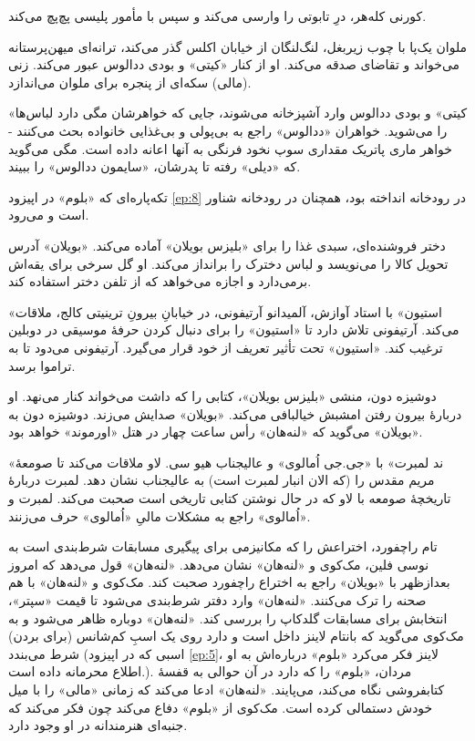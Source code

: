 \documentclass[12pt]{book}
\newcommand{\noun}[1]{«{#1}»}
\begin{document}
    کورنی کله‌هر، درِ تابوتی را وارسی می‌کند و سپس با مأمور پلیسی پچ‌پچ می‌کند.

    ملوان یک‌پا با چوب زیربغل، لنگ‌لنگان از خیابان اکلس گذر می‌کند، ترانه‌ای میهن‌پرستانه می‌خواند و تقاضای صدقه می‌کند. او از کنار \noun{کیتی} و بودی ددالوس عبور می‌کند. زنی (مالی) سکه‌ای از پنجره برای ملوان می‌اندازد.

    \noun{کیتی} و بودی ددالوس وارد آشپزخانه می‌شوند، جایی که خواهرشان مگی دارد لباس‌ها را می‌شوید. خواهران \noun{ددالوس} راجع به بی‌پولی و بی‌غذایی خانواده بحث می‌کنند - خواهر ماری پاتریک مقداری سوپ نخود فرنگی به آنها اعانه داده است. مگی می‌گوید که \noun{دیلی} رفته تا پدرشان، \noun{سایمون ددالوس‬} را ببیند.

    تکه‌پاره‌ای که \noun{بلوم} در اپیزود \ref{ep:8} در رودخانه انداخته بود، همچنان در رودخانه شناور است و می‌رود.

    دختر فروشنده‌ای، سبدی غذا را برای \noun{بلیزس بویلان‬} آماده می‌کند. \noun{بویلان} آدرس تحویل کالا را می‌نویسد و لباس دخترک را برانداز می‌کند. او گل سرخی برای یقه‌اش برمی‌دارد و اجازه می‌خواهد که از تلفن دختر استفاده کند.

    \noun{استیون} با استاد آوازش، آلمیدانو آرتیفونی، در خیابانِ بیرونِ ترینیتی کالج، ملاقات می‌کند. آرتیفونی تلاش دارد تا \noun{استیون} را برای دنبال کردن حرفۀ موسیقی در دوبلین ترغیب کند. \noun{استیون} تحت تأثیر تعریف از خود قرار می‌گیرد. آرتیفونی می‌دود تا به تراموا برسد.

    دوشیزه دون، منشی \noun{بلیزس بویلان‬}، کتابی را که داشت می‌خواند کنار می‌نهد. او دربارۀ بیرون رفتن امشبش خیالبافی می‌کند. \noun{بویلان} صدایش می‌زند. دوشیزه دون به \noun{بویلان} می‌گوید که \noun{لنه‌هان} رأس ساعت چهار در هتل \noun{اورموند} خواهد بود.

    \noun{ند لمبرت} با \noun{جی.جی اُمالوی} و عالیجناب هیو سی. لاو ملاقات می‌کند تا صومعۀ مریم مقدس را (که الان انبار لمبرت است) به عالیجناب نشان دهد. لمبرت دربارۀ تاریخچۀ صومعه با لاو که در حال نوشتن کتابی تاریخی است صحبت می‌کند. لمبرت و \noun{اُمالوی} راجع به مشکلات مالیِ \noun{اُمالوی} حرف می‌زنند.

    تام راچفورد، اختراعش را که مکانیزمی برای پیگیری مسابقات شرط‌بندی است به نوسی فلین، مک‌کوی و \noun{لنه‌هان} نشان می‌دهد. \noun{لنه‌هان} قول می‌دهد که امروز بعدازظهر با \noun{بویلان} راجع به اختراع راچفورد صحبت کند. مک‌کوی و \noun{لنه‌هان} با هم صحنه را ترک می‌کنند. \noun{لنه‌هان} وارد دفتر شرط‌بندی می‌شود تا قیمت \noun{سپتر}، انتخابش برای مسابقات گلدکاپ را بررسی کند. \noun{لنه‌هان} دوباره ظاهر می‌شود و به مک‌کوی می‌گوید که بانتام لاینز داخل است و دارد روی یک اسبِ کم‌شانس (برای بردن) شرط می‌بندد (اسبی که در اپیزود \ref{ep:5}، لاینز فکر می‌کرد \noun{بلوم} درباره‌اش به او اطلاع محرمانه داده است.). مردان، \noun{بلوم} را که دارد در آن حوالی به قفسۀ کتابفروشی نگاه می‌کند، می‌پایند. \noun{لنه‌هان} ادعا می‌کند که زمانی \noun{مالی} را با میل خودش دستمالی کرده است. مک‌کوی از \noun{بلوم} دفاع می‌کند چون فکر می‌کند که جنبه‌ای هنرمندانه در او وجود دارد.
\end{document}
